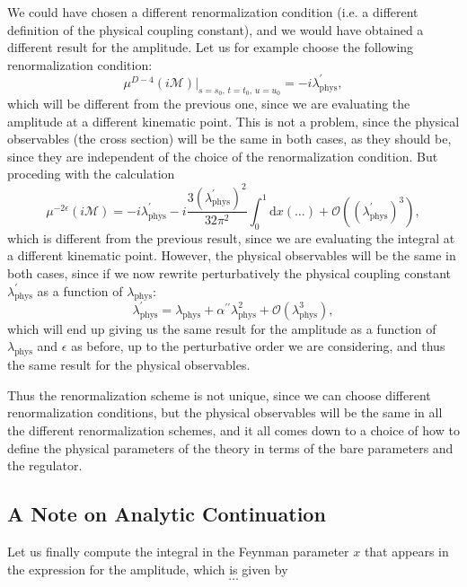 \begin{remark}
    We could have chosen a different renormalization condition (i.e. a different definition of the physical coupling constant), and we would have obtained a different result for the amplitude. Let us for example choose the following renormalization condition:
    \[
        \mu^{D-4} (i \mathcal{M}) \bigg\vert_{s=s_0,\, t= t_0,\, u= u_0} = - i \lambda_{\text{phys}}^{\prime},
    \]
    which will be different from the previous one, since we are evaluating the amplitude at a different kinematic point. This is not a problem, since the physical observables (the cross section) will be the same in both cases, as they should be, since they are independent of the choice of the renormalization condition. But proceding with the calculation
    \[
        \mu^{-2\epsilon} (i \mathcal{M}) = - i \lambda_{\text{phys}}^{\prime} - i \frac{3 (\lambda_{\text{phys}}^{\prime})^2}{32 \pi^2} \int_0^1 \mathrm{d}x  \left( \dots \right) + \mathcal{O}((\lambda_{\text{phys}}^{\prime})^3),
    \]
    which is different from the previous result, since we are evaluating the integral at a different kinematic point. However, the physical observables will be the same in both cases, since if we now rewrite perturbatively the physical coupling constant \(\lambda_{\text{phys}}^{\prime}\) as a function of \(\lambda_{\text{phys}}\):
    \[
        \lambda_{\text{phys}}^{\prime} = \lambda_{\text{phys}} + \alpha^{\prime \prime} \lambda_{\text{phys}}^2 + \mathcal{O}(\lambda_{\text{phys}}^3),
    \]
    which will end up giving us the same result for the amplitude as a function of \(\lambda_{\text{phys}}\) and \(\epsilon\) as before, up to the perturbative order we are considering, and thus the same result for the physical observables.
\end{remark}

Thus the renormalization scheme is not unique, since we can choose different renormalization conditions, but the physical observables will be the same in all the different renormalization schemes, and it all comes down to a choice of how to define the physical parameters of the theory in terms of the bare parameters and the regulator.

\subsection{A Note on Analytic Continuation}

Let us finally compute the integral in the Feynman parameter \(x\) that appears in the expression for the amplitude, which is given by
\[
    \dots
\]

